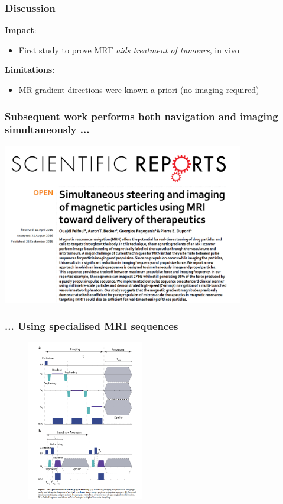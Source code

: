 \documentclass[8pt,xcolor=table]{beamer}
\begin{document}
\begin{frame}
\frametitle{Discussion}

\textbf{Impact}:
\begin{itemize}
 \item First study to prove MRT \emph{aids treatment of tumours}, in vivo
\end{itemize}

\vfill

\textbf{Limitations}:
\begin{itemize}
 \item MR gradient directions were known a-priori (no imaging required)
\end{itemize}


\end{frame}


\begin{frame}
\frametitle{Subsequent work performs both navigation and imaging simultaneously ...}

\includegraphics[height=7cm]{simult_mrt_imaging}

\end{frame}


\begin{frame}
\frametitle{... Using specialised MRI sequences}


\begin{figure}
\centering 
\includegraphics[height=7cm]{propulsion_grads}
\end{figure}


\end{frame}
\end{document}
